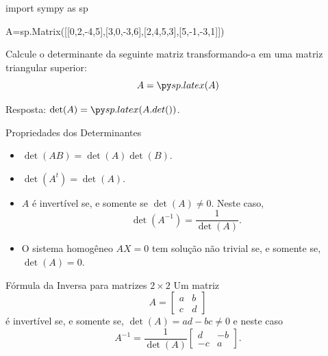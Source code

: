 \begin{frame}[label=determinantes,fragile=singleslide]
\begin{pycode}
import sympy as sp

A=sp.Matrix([[0,2,-4,5],[3,0,-3,6],[2,4,5,3],[5,-1,-3,1]])
\end{pycode}

\begin{exe}
Calcule  o determinante da seguinte matriz transformando-a em uma matriz triangular superior:
\[A=\pyl{A}\]

Resposta: $\det(A)=\pyl{A.det()}$.
\end{exe}



\end{frame}



\begin{frame}[label=determinantes]{Propriedades dos Determinantes}

\begin{itemize}
\item $\det(AB)=\det(A)\det(B)$.

\item $\det(A^t)=\det(A)$.

\item $A$ é invertível se, e somente se $\det(A)\neq 0$. Neste caso, \[\det(A^{-1})=\frac{1}{\det(A)}.\]

\item O sistema homogêneo $AX=0$ tem solução não trivial se, e somente se, $\det(A)=0$.
\end{itemize}

\end{frame}

%
%


\begin{frame}[label=determinantes]


\begin{block}{Fórmula da Inversa para matrizes $2\times 2$}
Um matriz 
\[A=\begin{bmatrix}
a & b \\ c & d 
\end{bmatrix}\]
 é invertível se, e somente se, $\det(A)=ad-bc\neq 0$ e neste caso
\[A^{-1}=\frac{1}{\det(A)}\begin{bmatrix}
d & -b \\ -c & a 
\end{bmatrix}.\]

\end{block}

\end{frame}


